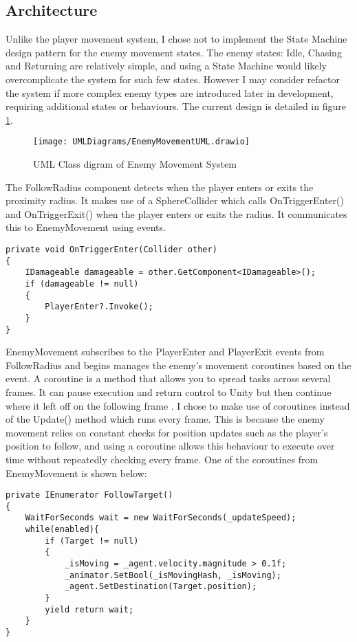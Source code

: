 \documentclass[10pt]{final_report}
\begin{document}
\subsection{Architecture}
Unlike the player movement system, I chose not to implement the State Machine design pattern for the enemy movement states. The enemy states: Idle, Chasing and Returning are relatively simple, and using a State Machine would likely overcomplicate the system for such few states. However I may consider refactor the system if more complex enemy types are introduced later in development, requiring additional states or behaviours. The current design is detailed in figure \ref{fig:label_enemyMovement}.
\begin{figure}[H]
    \centering
    \texttt{[image: UMLDiagrams/EnemyMovementUML.drawio]}
    \caption{UML Class digram of Enemy Movement System}
    \label{fig:label_enemyMovement}
\end{figure}
The FollowRadius component detects when the player enters or exits the proximity radius. It makes use of a SphereCollider which calls OnTriggerEnter() and OnTriggerExit() when the player enters or exits the radius. It communicates this to EnemyMovement using events. 
\begin{verbatim}
private void OnTriggerEnter(Collider other) 
{
    IDamageable damageable = other.GetComponent<IDamageable>();
    if (damageable != null)
    {
        PlayerEnter?.Invoke();
    }
}
\end{verbatim}
EnemyMovement subscribes to the PlayerEnter and PlayerExit events from FollowRadius and begins manages the enemy's movement coroutines based on the event. A coroutine is a method that allows you to spread tasks across several frames. It can pause execution and return control to Unity but then continue where it left off on the following frame \cite{unity2024_Coroutines}. I chose to make use of coroutines instead of the Update() method which runs every frame. This is because the enemy movement relies on constant checks for position updates such as the player's position to follow, and using a coroutine allows this behaviour to execute over time without repeatedly checking every frame. One of the coroutines from EnemyMovement is shown below:
\begin{verbatim}
private IEnumerator FollowTarget()
{
    WaitForSeconds wait = new WaitForSeconds(_updateSpeed);
    while(enabled){
        if (Target != null)
        {
            _isMoving = _agent.velocity.magnitude > 0.1f;
            _animator.SetBool(_isMovingHash, _isMoving);
            _agent.SetDestination(Target.position); 
        }
        yield return wait;
    }
}
\end{verbatim}
\end{document}
